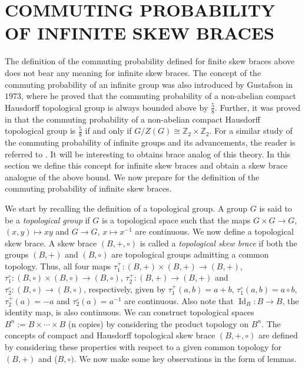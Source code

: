 \documentclass[oneside]{amsart}
\numberwithin{equation}{section}
\theoremstyle{plain}
\theoremstyle{definition}
\newcommand{\Id}{\operatorname{Id}}
\begin{document}
\section{COMMUTING PROBABILITY OF INFINITE SKEW BRACES}

The definition of the commuting probability defined for finite skew braces above does not bear any meaning for infinite skew braces. The concept of the commuting probability of an infinite group was also introduced by Gustafson \cite{WHG73} in $1973$, where he proved that the commuting probability of a non-abelian compact Hausdorff topological group  is always bounded above by $\frac{5}{8}$. Further, it was proved in \cite{EKG07} that the commuting probability of a non-abelian compact Hausdorff topological group  is $\frac{5}{8}$ if and only if $G/Z(G)\cong \mathbb{Z}_2\times \mathbb{Z}_2$. For a similar study of the commuting probability of infinite groups and its advancements, the reader is referred to \cite{AMV17, MCHT20}. It will be interesting to obtains brace analog of this theory.  In this section we define this concept for infinite skew braces and obtain a skew brace analogue of the above bound. We now prepare for the definition of the commuting probability of infinite skew braces.



We start by recalling the definition of  a topological group. A group $G$ is said to be  a  \emph{topological group} if $G$ is a topological space such that the maps $G\times G \rightarrow G$,  $(x, y) \mapsto xy$ and $G \rightarrow G$,  $x \mapsto x^{-1}$ are continuous.  We now define a topological skew brace. A skew brace $(B,+, \circ)$ is called a \emph{topological skew brace} if both the groups $(B,+)$ and $(B,\circ)$ are topological groups admitting a common topology. Thus, all four maps $\tau^+_1 :(B, +) \times (B, +) \to (B, +)$, $\tau^{\circ}_1 :(B, \circ) \times (B, \circ) \to (B, \circ)$, $\tau_2^+: (B, +)  \to (B, +)$ and $\tau_2^{\circ} : (B, \circ)  \to (B, \circ)$, respectively, given by $\tau^+_1(a, b) = a+b$, $\tau^{\circ}_1(a, b) = a \circ b$, $\tau^{+}_2(a) = -a$ and $\tau^{\circ}_2(a) =  a^{-1}$ are continuous. Also note that $\Id_B : B \to B$, the identity map, is also continuous. We can construct topological spaces $B^n := B \times \cdots \times B$ (n copies) by considering the product topology on $B^n$.  The concepts of compact and Hausdorff topological skew brace $(B, +, \circ)$ are defined by considering these properties with respect to a given common topology for $(B, +)$ and ($B, \circ)$.  We now make some key observations in the form of lemmas. 
\end{document}
